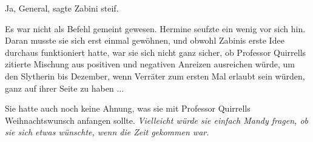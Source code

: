 \glqq{}Ja, General\grqq{}, sagte Zabini steif.

Es war nicht als Befehl gemeint gewesen. Hermine seufzte ein wenig vor sich hin.
Daran musste sie sich erst einmal gewöhnen, und obwohl Zabinis erste Idee
durchaus funktioniert hatte, war sie sich nicht ganz sicher, ob Professor
Quirrells zitierte Mischung aus positiven und negativen Anreizen ausreichen
würde, um den Slytherin bis Dezember, wenn Verräter zum ersten Mal erlaubt sein
würden, ganz auf ihrer Seite zu haben ...

Sie hatte auch noch keine Ahnung, was sie mit Professor Quirrells
Weihnachtswunsch anfangen sollte. \emph{ Vielleicht würde sie einfach Mandy
fragen, ob sie sich etwas wünschte, wenn die Zeit gekommen war.}
